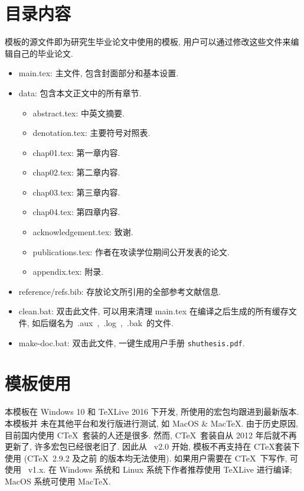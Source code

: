 \section{目录内容}
模板的源文件即为研究生毕业论文中使用的模板, 用户可以通过修改这些文件来编辑自己的毕业论文.
\begin{itemize}
\item{main.tex}: 主文件, 包含封面部分和基本设置.
\item{data}: 包含本文正文中的所有章节.
\begin{itemize}
\item{abstract.tex}: 中英文摘要.
\item{denotation.tex}: 主要符号对照表.
\item{chap01.tex}: 第一章内容.
\item{chap02.tex}: 第二章内容.
\item{chap03.tex}: 第三章内容.
\item{chap04.tex}: 第四章内容.
\item{acknowledgement.tex}: 致谢.
\item{publications.tex}: 作者在攻读学位期间公开发表的论文.
\item{appendix.tex}: 附录.
\end{itemize}
\item{reference/refs.bib}: 存放论文所引用的全部参考文献信息.
\item{clean.bat}: 双击此文件, 可以用来清理 main.tex 在编译之后生成的所有缓存文件, 
如后缀名为~.aux~,~.log~,~.bak~的文件.
\item{make-doc.bat}: 双击此文件, 一键生成用户手册 \texttt{shuthesis.pdf}.
\end{itemize}


\section{模板使用}
\label{sec:first}

本模板在 Windows 10 和 \TeX Live 2016 下开发, 所使用的宏包均跟进到最新版本. 本模板并
未在其他平台和发行版进行测试, 如 MacOS \& Mac\TeX. 由于历史原因, 目前国内使用 C\TeX\ 
套装的人还是很多. 然而, C\TeX\ 套装自从 2012 年后就不再更新了, 许多宏包已经很老旧了. 
因此从 \shuthesis\ v2.0 开始, 模板不再支持在 C\TeX 套装下使用 (C\TeX\ 2.9.2 及之前
的版本均无法使用). 如果用户需要在 C\TeX\ 下写作, 可使用 \shuthesis\ v1.x. 在 Windows 
系统和 Linux 系统下作者推荐使用 \TeX Live 进行编译; MacOS 系统可使用 Mac\TeX. 










